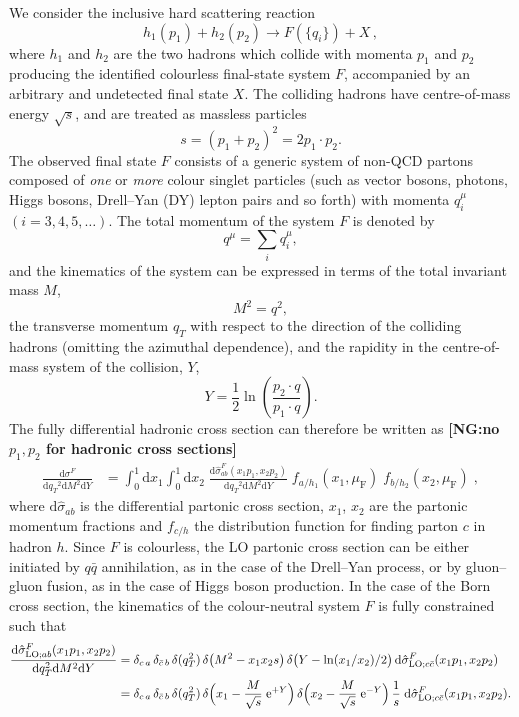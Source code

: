 \documentclass[12pt]{article}
\DeclareRobustCommand{\nn}{\nonumber}
\DeclareRobustCommand{\NG}[1]{\textbf{\quad\color{blue}[NG:\quad #1]}\xspace}
\DeclareRobustCommand{\muf}{\ensuremath{\mu_{\mathrm{F}}}\xspace}
\DeclareRobustCommand{\qt}{\ensuremath{q_T}\xspace}
\DeclareRobustCommand{\rd}{\ensuremath{\mathrm{d}}}
\DeclareRobustCommand{\re}{\ensuremath{\mathrm{e}}}
\DeclareRobustCommand{\LO}{\text{LO}\xspace}
\begin{document}
We consider the inclusive hard scattering reaction 
\begin{equation}
  h_1(p_1)+h_2(p_2)\to F(\{q_i\})+X\, ,
  \label{class}
\end{equation}
where $h_1$ and $h_2$ are the two hadrons which collide with momenta $p_1$ and $p_2$ producing the identified colourless final-state system $F$, accompanied by an arbitrary and undetected final state $X$. The colliding hadrons have centre-of-mass energy $\sqrt s$, and are treated as massless particles $$s= (p_1+p_2)^2 = 2p_1\cdot p_2.$$ The observed final state $F$ consists of a generic system of non-QCD partons composed of \emph{one} or \emph{more} colour singlet particles (such as vector bosons, photons, Higgs bosons, Drell--Yan (DY) lepton pairs and so forth) with momenta $q_i^{\mu}$ $(i=3,4,5,\dots)$. The total momentum of the system $F$ is denoted by $$q^{\mu}=\sum_i q_i^\mu,$$ and the kinematics of the system can be expressed in terms of the total invariant mass $M$, 
$$M^2=q^2,$$ 
the transverse momentum $\qt$ with respect to the direction of the colliding hadrons (omitting the azimuthal dependence), and the rapidity in the centre-of-mass system of the collision, $Y$, 
$$Y = \frac{1}{2} \ln \left(\frac{p_2\cdot q}{p_1\cdot q}\right).$$ 
The fully differential hadronic cross section can therefore be written as 
\NG{no $p_1,p_2$ for hadronic cross sections}
\begin{align}
  \frac{\rd\sigma^{F}}{\rd\qt^2\rd M^2\rd Y}
  &=
  \int_0^1\rd x_1 \int_0^1\rd x_2 \; 
  \frac{\rd\hat{\sigma}^{F}_{ab}(x_1 p_1, x_2 p_2)}{\rd\qt^2\rd M^2\rd Y} \;
  f_{a/h_1}(x_1,\muf) \; f_{b/h_2}(x_2,\muf) \;,
  \label{eq:hadXS_diff}
\end{align}
where $\rd\hat{\sigma}_{ab}$ is the differential partonic cross section, $x_1$, $x_2$ are the partonic momentum fractions and $f_{c/h}$ the distribution function for finding parton $c$ in hadron $h$.
Since $F$ is colourless, the LO partonic cross section can be either initiated by 
$q\bar{q}$ annihilation, as in the case of the Drell--Yan process, or by gluon--gluon fusion, as in the case of Higgs boson production.
In the case of the Born cross section, the kinematics of the colour-neutral system $F$ is fully constrained such that
\begin{align}
  \frac{\rd\hat{\sigma}^{F}_{\LO;ab}(x_1 p_1, x_2 p_2)}{\rd\qt^2\rd M^2\rd Y}
  &=
  \delta_{c\,a} \, \delta_{\bar{c}\,b} \, 
  \delta(\qt^2) \,
  \delta\bigl(M^2-x_1 x_2 s\bigr) \,
  \delta\bigl(Y-\ln(x_1/x_2)/2\bigr) \,
  \rd\hat{\sigma}^{F}_{\LO;c\bar{c}}(x_1 p_1, x_2 p_2)
  \nn\\
  &=
  \delta_{c\,a} \, \delta_{\bar{c}\,b} \, 
  \delta(\qt^2) \,
  \delta\Bigl(x_1-\frac{M}{\sqrt{s}}\;\re^{+Y}\Bigr) \,
  \delta\Bigl(x_2-\frac{M}{\sqrt{s}}\;\re^{-Y}\Bigr) \,
  \frac{1}{s} \;
  \rd\hat{\sigma}^{F}_{\LO;c\bar{c}}(x_1 p_1, x_2 p_2).
  \label{eq:LOpartXS_diff}
\end{align}
\end{document}
